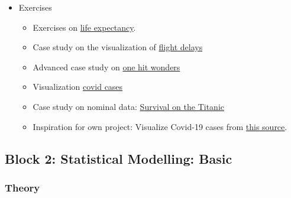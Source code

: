 \documentclass[
  letterpaper,
  DIV=11,
  numbers=noendperiod]{scrreprt}
\providecommand{\tightlist}{%
  \setlength{\itemsep}{0pt}\setlength{\parskip}{0pt}}\usepackage{longtable,booktabs,array}
\theoremstyle{definition}
\theoremstyle{definition}
\theoremstyle{remark}
\begin{document}
\begin{itemize}
\tightlist
\item
  Exercises

  \begin{itemize}
  \tightlist
  \item
    Exercises on
    \href{https://data-se.netlify.app/2021/02/24/exercises-to-data-wrangling-with-the-tidyverse}{life
    expectancy}.
  \item
    Case study on the visualization of
    \href{https://data-se.netlify.app/2021/02/24/exercises-no-solutions-data-vizualization-on-flight-delays-using-tidyverse-tools/}{flight
    delays}
  \item
    Advanced case study on
    \href{https://www.njtierney.com/post/2017/11/07/tidyverse-billboard/}{one
    hit wonders}
  \item
    Visualization
    \href{https://www.njtierney.com/post/2020/10/11/times-scales-covid/}{covid
    cases}
  \item
    Case study on nominal data:
    \href{https://www.kaggle.com/headsortails/tidy-titarnic}{Survival on
    the Titanic}
  \item
    Inspiration for own project: Visualize Covid-19 cases from
    \href{https://github.com/CSSEGISandData/COVID-19/tree/master/csse_covid_19_data/csse_covid_19_time_series}{this
    source}.
  \end{itemize}
\end{itemize}

\hypertarget{block-2-statistical-modelling-basic}{%
\subsection*{Block 2: Statistical Modelling:
Basic}\label{block-2-statistical-modelling-basic}}

\hypertarget{theory}{%
\subsubsection*{Theory}\label{theory}}
\end{document}

